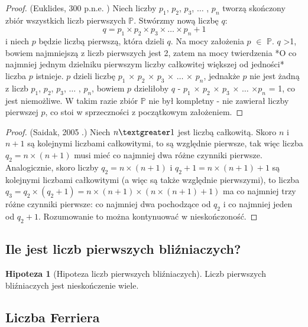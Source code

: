 \documentclass[10pt,onecolumn]{article}
\theoremstyle{definition}
\theoremstyle{hypothesis}
\newtheorem{hypothesis}{Hipoteza}
\theoremstyle{capability}
\begin{document}
\begin{proof}
(Euklides, 300 p.n.e. \cite{euklides300bc}) Niech liczby $p_1$, $p_2$, $p_3$, $\ldots$ , $p_n$ tworzą skończony zbiór wszystkich liczb pierwszych $\mathbb{P}$. Stwórzmy nową liczbę $q$: $$ q = p_1 \times p_2 \times p_3 \times \ldots \times p_n + 1$$ i niech $p$ będzie liczbą pierwszą, która dzieli $q$. Na mocy założenia $p$ $\in$ $\mathbb{P}$.
$q$ \textgreater 1, bowiem najmniejszą z liczb pierwszych jest 2, zatem na mocy twierdzenia *O co najmniej jednym dzielniku pierwszym liczby całkowitej większej od jedności* liczba $p$ istnieje. $p$ dzieli liczbę $p_1$ $\times$ $p_2$ $\times$ $p_3$ $\times$ $\ldots$ $\times$ $p_n$, jednakże $p$ nie jest żadną z liczb  $p_1$, $p_2$, $p_3$, $\ldots$ , $p_n$, bowiem $p$ dzieliłoby $q$ - $p_1$ $\times$ $p_2$ $\times$ $p_3$ $\times$ $\ldots$ $\times p_n$ = 1, co jest niemożliwe. W takim razie zbiór $\mathbb{P}$ nie był kompletny - nie zawierał liczby pierwszej $p$, co stoi w sprzeczności z początkowym założeniem.
\end{proof}

\begin{proof}
(Saidak, 2005 \cite{saidak2005}.) Niech $n \textgreater 1$ jest liczbą całkowitą. Skoro $n$ i $n+1$ są kolejnymi liczbami całkowitymi, to są względnie pierwsze, tak więc liczba $q_2 = n \times (n+1)$ musi mieć co najmniej dwa różne czynniki pierwsze. Analogicznie, skoro liczby $q_2 = n \times (n+1)$ i $q_2+1 = n \times  (n+1)+1$ są kolejnymi liczbami całkowitymi (a więc są także względnie pierwszymi), to liczba $q_3 = q_2 \times (q_2+1) = n \times (n+1) \times (n \times (n+1) +1)$ ma co najmniej trzy różne czynniki pierwsze: co najmniej dwa pochodzące od $q_2$ i co najmniej jeden od $q_2+1$. Rozumowanie to można kontynuować w nieskończoność.
\end{proof}

\subsection{Ile jest liczb pierwszych bliźniaczych?}

\begin{hypothesis}[Hipoteza liczb pierwszych bliźniaczych]
Liczb pierwszych bliźniaczych jest nieskończenie wiele.
\label{Twin_primes_hyp}
\end{hypothesis}

\subsection{Liczba Ferriera}
\end{document}
